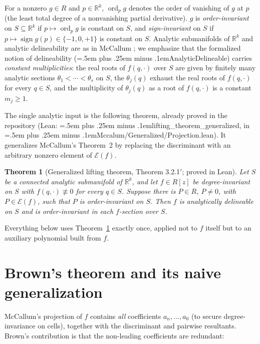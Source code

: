 \documentclass[11pt,a4paper]{article}
\newtheorem{theorem}{Theorem}[section]
\theoremstyle{definition}
\newcommand{\R}{\mathbb{R}}
\newcommand{\ord}{\operatorname{ord}}
\newcommand{\E}{\mathcal{E}}
\newcommand{\code}[1]{{\ttfamily\spaceskip=.5em plus .25em minus .1em\relax #1}}
\begin{document}
For a nonzero $g \in R$ and $p \in \R^k$, $\ord_p g$ denotes the order of
vanishing of $g$ at $p$ (the least total degree of a nonvanishing partial
derivative). $g$ is \emph{order-invariant} on $S \subseteq \R^k$ if
$p \mapsto \ord_p g$ is constant on $S$, and \emph{sign-invariant} on $S$ if
$p \mapsto \operatorname{sign} g(p) \in \{-1,0,+1\}$ is constant on $S$.
Analytic submanifolds of $\R^k$ and analytic delineability are as in McCallum
\cite{McCallum98}; we emphasize that the formalized notion of delineability
(\code{AnalyticDelineable}) carries \emph{constant multiplicities}: the real
roots of $f(q,\cdot)$ over $S$ are given by finitely many analytic sections
$\theta_1 < \cdots < \theta_s$ on $S$, the $\theta_j(q)$ exhaust the real roots
of $f(q,\cdot)$ for every $q\in S$, and the multiplicity of $\theta_j(q)$ as a
root of $f(q,\cdot)$ is a constant $m_j \geq 1$.

The single analytic input is the following theorem, already proved in the
repository (Lean: \code{lifting\_theorem\_generalized}, in
\code{Mccalum/Generalized/Projection.lean}). It generalizes McCallum's
Theorem~2 \cite{McCallum98} by replacing the discriminant with an arbitrary
nonzero element of $\E(f)$.

\begin{theorem}[Generalized lifting theorem, Theorem 3.2.1$'$; proved in Lean]
\label{thm:lifting}
Let $S$ be a connected analytic submanifold of $\R^k$, and let $f \in R[z]$ be
degree-invariant on $S$ with $f(q,\cdot) \not\equiv 0$ for every $q \in S$.
Suppose there is $P \in R$, $P \neq 0$, with $P \in \E(f)$, such that $P$ is
order-invariant on $S$. Then $f$ is analytically delineable on $S$ and is
order-invariant in each $f$-section over $S$.
\end{theorem}

Everything below uses Theorem~\ref{thm:lifting} exactly once, applied not to
$f$ itself but to an auxiliary polynomial built from $f$.

\section{Brown's theorem and its naive generalization}\label{sec:brown}

McCallum's projection of $f$ contains \emph{all} coefficients $a_n,\dots,a_0$
(to secure degree-invariance on cells), together with the discriminant and
pairwise resultants. Brown's contribution \cite[Theorem~3.1]{Brown01} is that
the non-leading coefficients are redundant:
\end{document}
